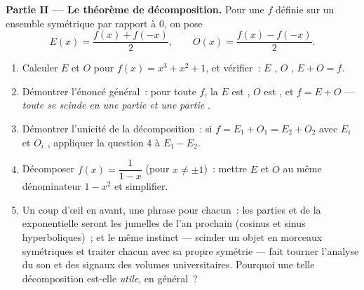 \begin{problem}
\medskip
\noindent\textbf{Partie II --- Le théorème de décomposition.}
Pour une  $f$ définie sur un ensemble symétrique par rapport
à $0$, on pose
\[
E(x) = \frac{f(x) + f(-x)}{2},
\qquad
O(x) = \frac{f(x) - f(-x)}{2} .
\]
\begin{enumerate}[resume]
  \item Calculer $E$ et $O$ pour $f(x) = x^3 + x^2 + 1$, et
        vérifier~: $E$ , $O$ , $E + O = f$.
  \item Démontrer l'énoncé général~: pour toute $f$, la  $E$
        est , $O$ est , et $f = E + O$ --- \emph{toute
         se scinde en une partie  et une partie
        }.
  \item Démontrer l'unicité de la décomposition~: si
        $f = E_1 + O_1 = E_2 + O_2$ avec $E_i$  et $O_i$
        , appliquer la question 4 à $E_1 - E_2$.
  \item Décomposer $f(x) = \dfrac{1}{1 - x}$ (pour
        $x \neq \pm 1$)~: mettre $E$ et $O$ au même dénominateur
        $1 - x^2$ et simplifier.
  \item Un coup d'œil en avant, une phrase pour chacun~: les parties
         et  de la  exponentielle seront les
         jumelles de l'an prochain (cosinus et sinus
        hyperboliques)~; et le même instinct --- scinder un objet en
        morceaux symétriques et traiter chacun avec sa propre
        symétrie --- fait tourner l'analyse du son et des signaux
        des volumes universitaires. Pourquoi une telle décomposition
        est-elle \emph{utile}, en général~?
\end{enumerate}


\end{problem}
